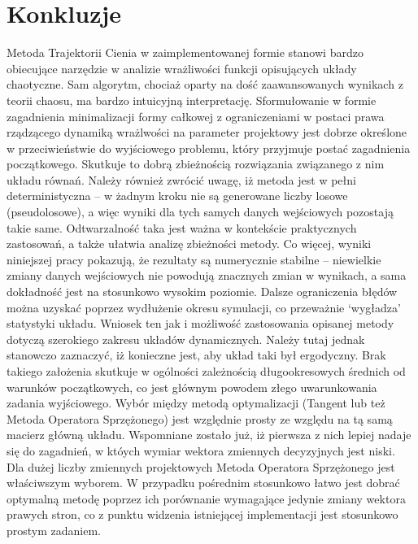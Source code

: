 \documentclass[12pt, twoside]{book}
\begin{document}
\section{Konkluzje}
Metoda Trajektorii Cienia w zaimplementowanej formie stanowi bardzo obiecujące narzędzie w analizie wrażliwości funkcji opisujących układy chaotyczne. Sam algorytm, chociaż oparty na dość zaawansowanych wynikach z teorii chaosu, ma bardzo intuicyjną interpretację. Sformułowanie w formie zagadnienia minimalizacji formy całkowej z ograniczeniami w postaci prawa rządzącego dynamiką wrażlwości na parameter projektowy jest dobrze określone w przeciwieństwie do wyjściowego problemu, który przyjmuje postać zagadnienia początkowego. Skutkuje to dobrą zbieżnością rozwiązania związanego z nim układu równań. \newline
Należy również zwrócić uwagę, iż metoda jest w pełni deterministyczna – w żadnym kroku nie są generowane liczby losowe (pseudolosowe), a więc wyniki dla tych samych danych wejściowych pozostają takie same. Odtwarzalność taka jest ważna w kontekście praktycznych zastosowań, a także ułatwia analizę zbieżności metody. Co więcej, wyniki niniejszej pracy pokazują, że rezultaty są numerycznie stabilne – niewielkie zmiany danych wejściowych nie powodują znacznych zmian w wynikach, a sama dokładność jest na stosunkowo wysokim poziomie. \newline
Dalsze ograniczenia błędów można uzyskać poprzez wydłużenie okresu symulacji, co przeważnie ‘wygładza’ statystyki układu. Wniosek ten jak i możliwość zastosowania opisanej metody dotyczą szerokiego zakresu układów dynamicznych. Należy tutaj jednak stanowczo zaznaczyć, iż konieczne jest, aby układ taki był ergodyczny. Brak takiego założenia skutkuje w ogólności zależnością długookresowych średnich od warunków początkowych, co jest głównym powodem złego uwarunkowania zadania wyjściowego. \newline
Wybór między metodą optymalizacji (Tangent lub też Metoda Operatora Sprzężonego) jest względnie prosty ze względu na tą samą macierz główną układu. Wspomniane zostało już, iż pierwsza z nich lepiej nadaje się do zagadnień, w któych wymiar wektora zmiennych decyzyjnych jest niski. Dla dużej liczby zmiennych projektowych Metoda Operatora Sprzężonego jest właściwszym wyborem. W przypadku pośrednim stosunkowo łatwo jest dobrać optymalną metodę poprzez ich porównanie wymagające jedynie zmiany wektora prawych stron, co z punktu widzenia istniejącej implementacji jest stosunkowo prostym zadaniem. \newline
\end{document}
